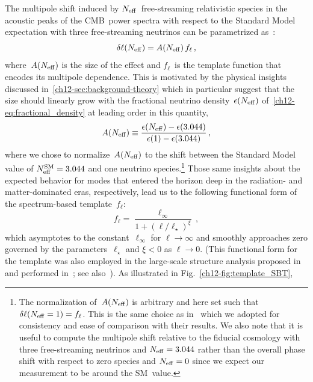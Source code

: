 The multipole shift induced by $N_\mathrm{eff}$~free-streaming relativistic species in the acoustic peaks of the CMB~power spectra with respect to the Standard Model expectation with three free-streaming neutrinos can be parametrized as~\cite{Follin:2015hya}:
\begin{equation}
	\delta\ell(N_\mathrm{eff}) = A(N_\mathrm{eff})\,f_\ell \, ,	\label{ch12-eq:delta_ell_def1}
\end{equation}
where~$A(N_\mathrm{eff})$ is the size of the effect and $f_\ell$~is the template function that encodes its multipole dependence. This is motivated by the physical insights discussed in~\textsection\ref{ch12-sec:background-theory} which in particular suggest that the size should linearly grow with the fractional neutrino density~$\epsilon(N_\mathrm{eff})$ of~\eqref{ch12-eq:fractional_density} at leading order in this quantity,
\begin{equation}
	A(N_\mathrm{eff}) \equiv \frac{\epsilon(N_\mathrm{eff})-\epsilon(3.044)}{\epsilon(1)-\epsilon(3.044)}\, ,	\label{ch12-eq:ANeff}
\end{equation}
where we chose to normalize~$A(N_\mathrm{eff})$ to the shift between the Standard Model value of $N_\mathrm{eff}^\mathrm{SM} = 3.044$ and one neutrino species.\footnote{The normalization of~$A(N_\mathrm{eff})$ is arbitrary and here set such that $\delta\ell(N_\mathrm{eff} = 1) = f_\ell$. This is the same choice as in~\cite{Follin:2015hya} which we adopted for consistency and ease of comparison with their results. We also note that it is useful to compute the multipole shift relative to the fiducial cosmology with three free-streaming neutrinos and $N_\mathrm{eff} = 3.044$ rather than the overall phase shift with respect to zero species and $N_\mathrm{eff} = 0$ since we expect our measurement to be around the SM~value.} Those same insights about the expected behavior for modes that entered the horizon deep in the radiation- and matter-dominated eras, respectively, lead us to the following functional form of the spectrum-based template~$f_\ell$:
\begin{equation}
	f_\ell = \frac{\ell_\infty}{1 + (\ell/\ell_\star)^\xi}\, ,	\label{ch12-eq:f_ell_def}
\end{equation}
which asymptotes to the constant~$\ell_\infty$ for $\ell \to \infty$ and smoothly approaches zero governed by the parameters~$\ell_\star$ and $\xi < 0$ as $\ell \to 0$. (This functional form for the template was also employed in the large-scale structure analysis proposed in~\cite{Baumann:2017gkg} and performed in~\cite{Baumann:2019keh, Whitford:2024ecj}; see also~\cite{Green:2020fjb}). As illustrated in Fig.~\ref{ch12-fig:template_SBT},%

